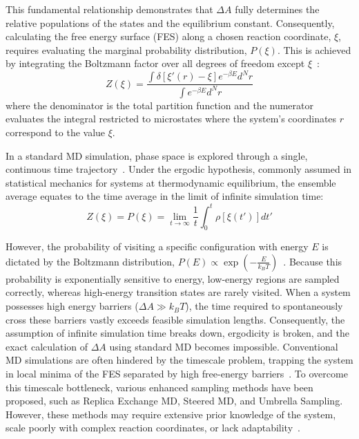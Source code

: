 This fundamental relationship demonstrates that $\Delta A$ fully determines the relative populations of the states and the equilibrium constant. Consequently, calculating the free energy surface (FES) along a chosen reaction coordinate, $\xi$, requires evaluating the marginal probability distribution, $P(\xi)$. This is achieved by integrating the Boltzmann factor over all degrees of freedom except $\xi$~\cite{termo_1,termo_2}:
\begin{equation}
    Z(\xi) = \frac{\int \delta[\xi'(r) - \xi] e^{-\beta E} d^N r}{\int e^{-\beta E} d^N r}
\end{equation}
where the denominator is the total partition function and the numerator evaluates the integral restricted to microstates where the system's coordinates $r$ correspond to the value $\xi$.

In a standard MD simulation, phase space is explored through a single, continuous time trajectory~\cite{termo_metad_presion,termo_1,termo_2}. Under the ergodic hypothesis, commonly assumed in statistical mechanics for systems at thermodynamic equilibrium, the ensemble average equates to the time average in the limit of infinite simulation time:
\begin{equation}
    Z(\xi) = P(\xi) = \lim_{t \to \infty} \frac{1}{t} \int_0^t \rho[\xi(t')] dt'
\end{equation}

However, the probability of visiting a specific configuration with energy $E$ is dictated by the Boltzmann distribution, $P(E) \propto \exp\left(-\frac{E}{k_B T}\right)$~\cite{termo_1,termo_2}. Because this probability is exponentially sensitive to energy, low-energy regions are sampled correctly, whereas high-energy transition states are rarely visited. When a system possesses high energy barriers ($\Delta A \gg k_B T$), the time required to spontaneously cross these barriers vastly exceeds feasible simulation lengths. Consequently, the assumption of infinite simulation time breaks down, ergodicity is broken, and the exact calculation of $\Delta A$ using standard MD becomes impossible.
Conventional MD simulations are often hindered by the timescale problem, trapping the system in local minima of the FES separated by high free-energy barriers~\cite{Laio2002}. To overcome this timescale bottleneck, various enhanced sampling methods have been proposed, such as Replica Exchange MD, Steered MD, and Umbrella Sampling. However, these methods may require extensive prior knowledge of the system, scale poorly with complex reaction coordinates, or lack adaptability~\cite{termo_metad_presion}.

